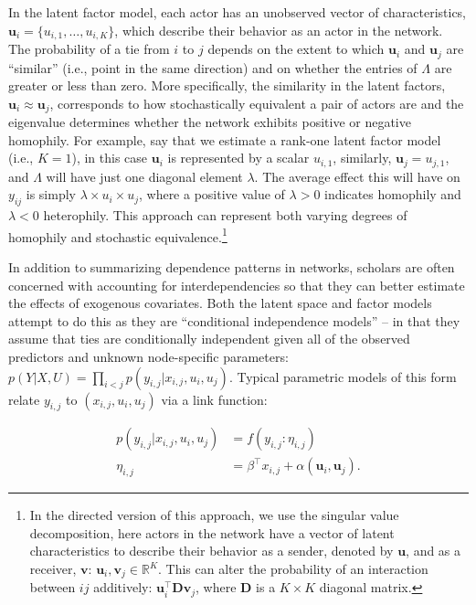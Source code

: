 \documentclass[12pt,pdflatex]{elsarticle}
\begin{document}
In the latent factor model, each actor has an unobserved vector of characteristics, $\textbf{u}_{i} = \{u_{i,1}, \ldots, u_{i,K} \}$, which describe their behavior as an actor in the network. The probability of a tie from $i$ to $j$ depends on the extent to which $\textbf{u}_{i}$ and $\textbf{u}_{j}$ are ``similar'' (i.e., point in the same direction) and on whether the entries of $\Lambda$ are greater or less than zero. More specifically, the similarity in the latent factors, $\textbf{u}_{i} \approx \textbf{u}_{j}$, corresponds to how stochastically equivalent a pair of actors are and the eigenvalue determines whether the network exhibits positive or negative homophily. For example, say that we estimate a rank-one latent factor model (i.e., $K=1$), in this case $\textbf{u}_{i}$ is represented by a scalar $u_{i,1}$, similarly, $\textbf{u}_{j}=u_{j,1}$, and $\Lambda$ will have just one diagonal element $\lambda$. The average effect this will have on $y_{ij}$ is simply $\lambda \times u_{i} \times u_{j}$, where a positive value of $\lambda>0$ indicates homophily and $\lambda<0$ heterophily. This approach can represent both varying degrees of homophily and stochastic equivalence.\footnote{In the directed version of this approach, we use the singular value decomposition, here actors in the network have a vector of latent characteristics to describe their behavior as a sender, denoted by $\textbf{u}$, and as a receiver, $\textbf{v}$: $\textbf{u}_{i}, \textbf{v}_{j} \in \mathbb{R}^{K}$. This can alter the probability of an interaction between $ij$ additively: $\textbf{u}_{i}^{\top} \textbf{D} \textbf{v}_{j}$, where $\textbf{D}$ is a $K \times K$ diagonal matrix.}

In addition to summarizing dependence patterns in networks, scholars are often concerned with accounting for interdependencies so that they can better estimate the effects of exogenous covariates. Both the latent space and factor models attempt to do this as they are ``conditional independence models'' --  in that they assume that ties are conditionally independent given all of the observed predictors and unknown node-specific parameters: $p( Y | X , U ) = \prod_{i<j} p( y_{i,j}  | x_{i,j} , u_i , u_j)$. Typical parametric models of this form relate $y_{i,j}$ to $(x_{i,j},u_i,u_j)$ via a link function:

\begin{align*}
	p(y_{i,j} | x_{i,j}, u_i , u_j ) & = f( y_{i,j} : \eta_{i,j} ) \\
	\eta_{i,j} &= \beta^\top x_{i,j} + \alpha(\textbf{u}_{i}, \textbf{u}_{j}).
\end{align*}
\end{document}
